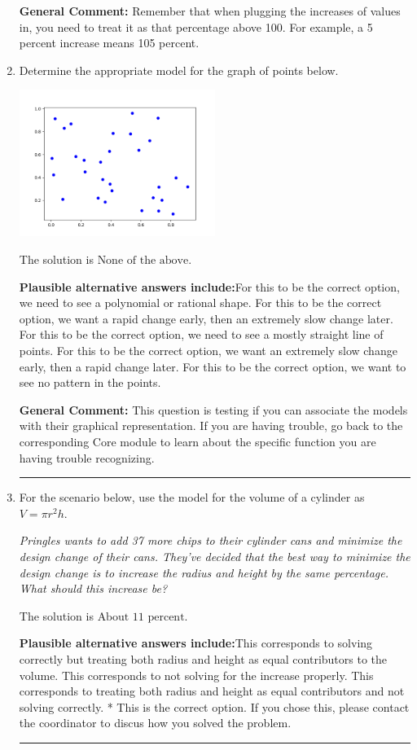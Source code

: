\documentclass{extbook}[14pt]
\newcommand{\litem}[1]{\item #1

\rule{\textwidth}{0.4pt}}
\begin{document}
\begin{enumerate}
{\textbf{General Comment:} Remember that when plugging the increases of values in, you need to treat it as that percentage above 100. For example, a 5 percent increase means 105 percent.
}
\litem{
Determine the appropriate model for the graph of points below.

\begin{center}
    \includegraphics[width=0.5\textwidth]{../Figures/identifyModelGraph12CopyC.png}
\end{center}


The solution is \( \text{None of the above} \).\begin{enumerate}[label=\Alph*.]
\textbf{Plausible alternative answers include:}For this to be the correct option, we need to see a polynomial or rational shape.
For this to be the correct option, we want a rapid change early, then an extremely slow change later.
For this to be the correct option, we need to see a mostly straight line of points.
For this to be the correct option, we want an extremely slow change early, then a rapid change later.
For this to be the correct option, we want to see no pattern in the points.
\end{enumerate}

\textbf{General Comment:} This question is testing if you can associate the models with their graphical representation. If you are having trouble, go back to the corresponding Core module to learn about the specific function you are having trouble recognizing.
}
\litem{
For the scenario below, use the model for the volume of a cylinder as $V = \pi r^2 h$.

\begin{center}
    \textit{ Pringles wants to add 37 \text{percent} more chips to their cylinder cans and minimize the design change of their cans. They've decided that the best way to minimize the design change is to increase the radius and height by the same percentage. What should this increase be? }
\end{center}
The solution is \( \text{About } 11 \text{ percent} \).\begin{enumerate}[label=\Alph*.]
\textbf{Plausible alternative answers include:}This corresponds to solving correctly but treating both radius and height as equal contributors to the volume.
This corresponds to not solving for the increase properly.
This corresponds to treating both radius and height as equal contributors and not solving correctly.
* This is the correct option.
If you chose this, please contact the coordinator to discus how you solved the problem.
\end{enumerate}

}
\end{enumerate}
\end{document}
